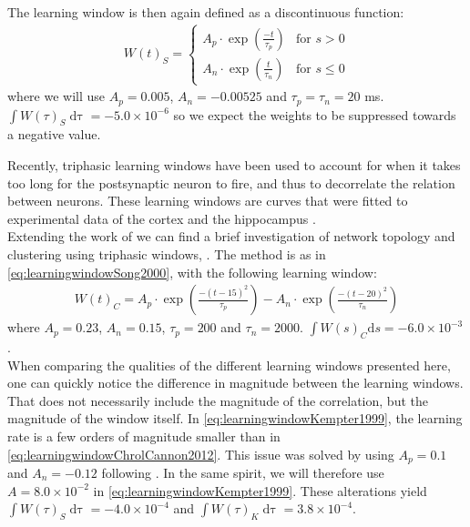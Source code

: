 The learning window is then again defined as a discontinuous function:
\begin{align}
W(t)_S =
\begin{cases}
A_{p} \cdot \exp \left(\frac{-t}{\tau_p}\right) & \text{for } s > 0 \\
A_{n} \cdot \exp \left(\frac{t}{\tau_n}\right)  & \text{for } s \leq 0
\end{cases} \label{eq:learningwindowSong2000}
\end{align}
where we will use $A_p = 0.005$, $A_n = -0.00525$ and $\tau_p = \tau_n = 20$ ms. $\int W(\tau)_S \mathop{d \tau} = -5.0 \times 10^{-6}$ so we expect the weights to be suppressed towards a negative value. 

Recently, triphasic learning windows have been used to account for when it takes too long for the postsynaptic neuron to fire, and thus to decorrelate the relation between neurons. These learning windows are curves that were fitted to experimental data of the cortex and the hippocampus \cite{ChrolCannon2014}. \\

Extending the work of \cite{Song2000} we can find a brief investigation of network topology and clustering using triphasic windows, \cite{ChrolCannon2012}. The method is as in \eqref{eq:learningwindowSong2000}, with the following learning window:
\begin{align}
W(t)_C = A_{p} \cdot \exp \left(\frac{-\left(t - 15 \right)^{2}}{ \tau_{p}}\right) - A_{n} \cdot \exp \left(\frac{-\left(t - 20\right)^{2}}{ \tau_{n}}\right)  \label{eq:learningwindowChrolCannon2012}
\end{align}
where $A_{p}=0.23$, $A_{n}=0.15$, $\tau_{p}=200$ and $\tau_n = 2000$. $\int W(s)_C \mathrm{d}s = -6.0 \times 10^{-3}$. \\

When comparing the qualities of the different learning windows presented here, one can quickly notice the difference in magnitude between the learning windows. That does not necessarily include the magnitude of the correlation, but the magnitude of the window itself. In \eqref{eq:learningwindowKempter1999}, the learning rate is a few orders of magnitude smaller than in \eqref{eq:learningwindowChrolCannon2012}. This issue was solved by using $A _p = 0.1$ and $A_n = -0.12$ following \cite{ChrolCannon2012}. In the same spirit, we will therefore use $A = 8.0 \times 10^{-2}$ in \eqref{eq:learningwindowKempter1999}. These alterations yield $\int W(\tau)_S \mathop{d \tau} = -4.0 \times 10^{-4}$ and $\int W(\tau)_K \mathop{d \tau} = 3.8 \times 10^{-4}$.

